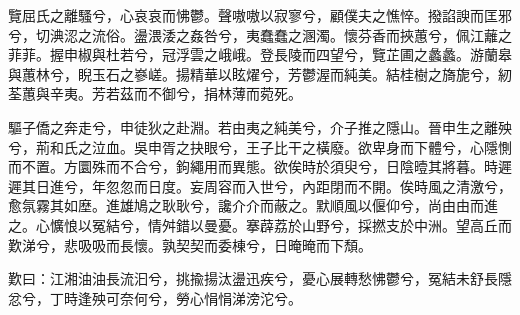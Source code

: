 
\begin{pinyinscope}
覽屈氏之離騷兮，心哀哀而怫鬱。聲嗷嗷以寂寥兮，顧僕夫之憔悴。撥諂諛而匡邪兮，切淟涊之流俗。盪渨涹之姦咎兮，夷蠢蠢之溷濁。懷芬香而挾蕙兮，佩江蘺之菲菲。握申椒與杜若兮，冠浮雲之峨峨。登長陵而四望兮，覽芷圃之蠡蠡。游蘭皋與蕙林兮，睨玉石之嵾嵯。揚精華以眩燿兮，芳鬱渥而純美。結桂樹之旖旎兮，紉荃蕙與辛夷。芳若茲而不御兮，捐林薄而菀死。

驅子僑之奔走兮，申徒狄之赴淵。若由夷之純美兮，介子推之隱山。晉申生之離殃兮，荊和氏之泣血。吳申胥之抉眼兮，王子比干之橫廢。欲卑身而下體兮，心隱惻而不置。方圜殊而不合兮，鉤繩用而異態。欲俟時於須臾兮，日陰曀其將暮。時遲遲其日進兮，年忽忽而日度。妄周容而入世兮，內距閉而不開。俟時風之清激兮，愈氛霧其如塺。進雄鳩之耿耿兮，讒介介而蔽之。默順風以偃仰兮，尚由由而進之。心懭悢以冤結兮，情舛錯以曼憂。搴薜荔於山野兮，採撚支於中洲。望高丘而歎涕兮，悲吸吸而長懷。孰契契而委棟兮，日晻晻而下頹。

歎曰：江湘油油長流汩兮，挑揄揚汰盪迅疾兮，憂心展轉愁怫鬱兮，冤結未舒長隱忿兮，丁時逢殃可奈何兮，勞心悁悁涕滂沱兮。


\end{pinyinscope}